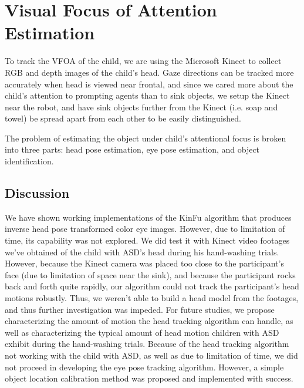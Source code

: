 \chapter{Visual Focus of Attention Estimation}

To track the VFOA of the child, we are using the Microsoft Kinect to collect RGB and depth images of the child's head.  Gaze directions can be tracked more accurately when head is viewed near frontal, and since we cared more about the child's attention to prompting agents than to sink objects, we setup the Kinect near the robot, and have sink objects further from the Kinect (i.e. soap and towel) be spread apart from each other to be easily distinguished.

The problem of estimating the object under child's attentional focus is broken into three parts: head pose estimation, eye pose estimation, and object identification.


%
%	
%	







\section{Discussion}
We have shown working implementations of the KinFu algorithm that produces inverse head pose transformed color eye images.  However, due to limitation of time, its capability was not explored.  We did test it with Kinect video footages we've obtained of the child with ASD's head during his hand-washing trials.  However, because the Kinect camera was placed too close to the participant's face (due to limitation of space near the sink), and because the participant rocks back and forth quite rapidly, our algorithm could not track the participant's head motions robustly.  Thus, we weren't able to build a head model from the footages, and thus further investigation was impeded.  For future studies, we propose characterizing the amount of motion the head tracking algorithm can handle, as well as characterizing the typical amount of head motion children with ASD exhibit during the hand-washing trials.  Because of the head tracking algorithm not working with the child with ASD, as well as due to limitation of time, we did not proceed in developing the eye pose tracking algorithm.  However, a simple object location calibration method was proposed and implemented with success.